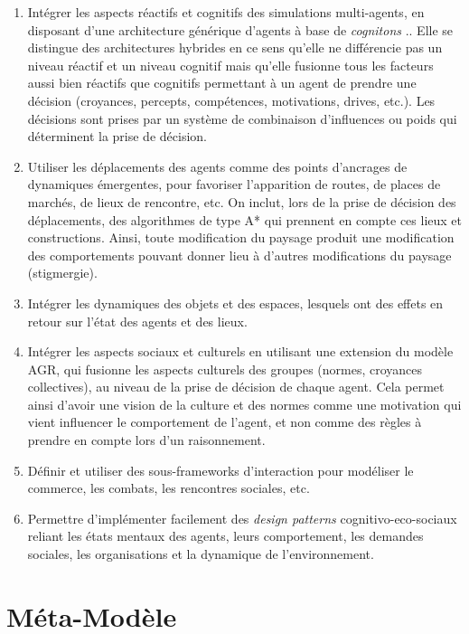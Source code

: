 \documentclass[a4paper,oneside,12 pt]{article}
\begin{document}
\begin{enumerate}
  \item Intégrer les aspects réactifs et cognitifs des simulations multi-agents, en disposant d’une architecture générique d’agents à base de \emph{cognitons} \cite{jacques1995systemes}.. Elle se distingue des architectures hybrides en ce sens qu’elle ne différencie pas un niveau réactif et un niveau cognitif mais qu’elle fusionne tous les facteurs aussi bien réactifs que cognitifs permettant à un agent de prendre une décision (croyances, percepts, compétences, motivations, drives, etc.). Les décisions sont prises par un système de combinaison d’influences ou poids qui déterminent la prise de décision.
  \item Utiliser les déplacements des agents comme des points d'ancrages de dynamiques émergentes, pour favoriser l'apparition de routes, de places de marchés, de lieux de rencontre, etc. On inclut, lors de la prise de décision des déplacements, des algorithmes de type A* qui prennent en compte ces lieux et constructions. Ainsi, toute modification du paysage produit une modification des comportements pouvant donner lieu à d'autres modifications du paysage (stigmergie).
  \item Intégrer les dynamiques des objets et des espaces, lesquels ont des effets en retour sur l'état des agents et des lieux.
  \item Intégrer les aspects sociaux et culturels en utilisant une extension du modèle AGR, qui fusionne les aspects culturels des groupes (normes, croyances collectives), au niveau de la prise de décision de chaque agent. Cela permet ainsi d'avoir une vision de la culture et des normes comme une motivation qui vient influencer le comportement de l'agent, et non comme des règles à prendre en compte lors d'un raisonnement.
  \item Définir et utiliser des sous-frameworks d'interaction pour modéliser le commerce, les combats, les rencontres sociales, etc.
  \item Permettre d'implémenter facilement des \emph{design patterns} cognitivo-eco-sociaux reliant les états mentaux des agents, leurs comportement, les demandes sociales, les organisations et la dynamique de l'environnement.
\end{enumerate}


\section{Méta-Modèle}
\end{document}
